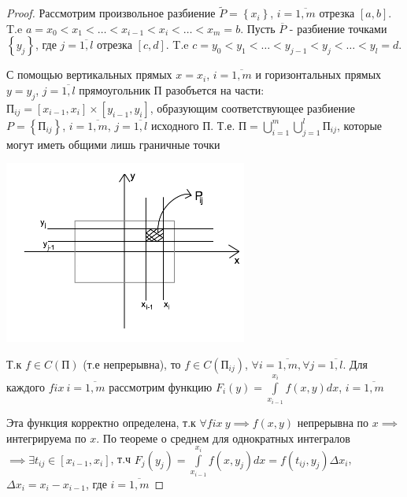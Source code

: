 \documentclass[../../main.tex]{subfiles}
\begin{document}
\begin{proof}
	Рассмотрим произвольное разбиение $ \widetilde{P} = 
	\left\lbrace x_i \right\rbrace  $, $i = \overline{1,m} $ 
	отрезка $ \left[ a, b\right]  $. T.e $a = x_0 < x_1 < \dots 
	< x_{i-1} < x_i < \dots < x_m = b $. Пусть $ \overline{P} $
	 - разбиение точками $ \left\lbrace y_j \right\rbrace  $, 
	 где $j = \overline{1, l} $ отрезка $ \left[ c, d\right]  $. 
	 T.e $c = y_0 < y_1 < \dots < y_{j-1} < y_j < \dots < y_l = d $.
	 
	 С помощью вертикальных прямых $ x = x_i $, $ i = \overline{1, m} $
	 и горизонтальных прямых $ y = y_j $, $ j = \overline{1, l} $
	 прямоугольник $ \text{П} $ разобъется на части: $ \text{П}_{ij} = 
	 \left[ x_{i - 1}, x_i \right] \times \left[ y_{i - 1}, y_i \right] $, образующим
	 соответствующее разбиение $ P = \left\lbrace \text{П}_{ij} \right\rbrace $,
	 $ i = \overline{1, m} $, $ j = \overline{1, l} $ исходного $ \text{П} $. Т.е. 
	 $ \text{П} = \bigcup\limits_{i = 1}^m \bigcup\limits_{j = 1}^l \text{П}_{ij}$, 
	 которые могут иметь общими лишь граничные точки
	 
	 \begin{center}
	 	\includegraphics[width=0.6\textwidth]{lec13_rectangle.png}
	 \end{center}
 
 	Т.к $ f \in C( \text{П} )$ (т.е непрерывна), то $ f \in C( \text{П}_{ij} )$,
 	$ \forall i = \overline{1, m} , \forall j = \overline{1, l}$. Для каждого 
 	$ fix\ i = \overline{1, m} $ рассмотрим функцию $ F_i \left( y \right) = 
 	\int\limits_{ x_{i - 1} } ^ {x_i} f \left( x, y \right) dx $, $ i = \overline{1, m} $
 	
 	Эта функция корректно определена, т.к $ \forall fix\ y \implies f \left( x, y\right) $
 	непрерывна по $ x \implies $ интегрируема по $ x $. По теореме о среднем
 	для однократных интегралов $ \implies \exists t_{ij} \in \left[ x_{i - 1}, x_i \right] $, 
 	т.ч $ F_j \left( y_j \right) = \int\limits_{x_{i - 1} } ^ {x_i} f \left( x, y_j \right) dx = 
 	f \left(  t_{ij}, y_j \right) \Delta x_i$, $ \Delta x_i = x_i - x_{i - 1}$, где 
 	$ i = \overline{1, m} $
 	

\end{proof}
\end{document}
